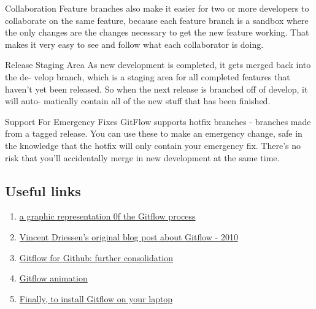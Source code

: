 \documentclass{tufte-handout}
\begin{document}
		\alphaparagraph Collaboration Feature branches also make it easier for two or more
		developers to collaborate on the same feature, because each feature
		branch is a sandbox where the only changes are the changes necessary to get the new
		feature working. That makes it very easy to see and follow what each
		collaborator is doing.
		\medskip
		
		\alphaparagraph Release Staging Area As new development is completed, it gets merged
		back into the de- velop branch, which is a staging area for all
		completed features that haven't yet been released. So when the next
		release is branched off of develop, it will auto- matically contain all
		of the new stuff that has been finished.
		\medskip
		
		\alphaparagraph Support For Emergency Fixes GitFlow supports hotfix branches -
		branches made from a tagged release. You can use these to make an
		emergency change, safe in the knowledge that the hotfix will only
		contain your emergency fix. There's no risk that you'll accidentally
		merge in new development at the same time.
		
		\clearpage
		
		\subsection{Useful links}
		
		\begin{enumerate}
			\def\labelenumi{\arabic{enumi}.}
			\item
			\href{https://danielkummer.github.io/git-flow-cheatsheet/#features}{a graphic representation 0f the Gitflow process}
			\item
			\href{https://nvie.com/posts/a-successful-git-branching-model/}{Vincent Driessen's original blog post about Gitflow - 2010}
			\item
			\href{https://datasift.github.io/gitflow/GitFlowForGitHub.html}{Gitflow for Github: further consolidation}
			\item
			\href{https://veerasundar.com/blog/2018/03/gitflow-animated/}{Gitflow animation}
			\item
			\href{https://github.com/nvie/gitflow/}{Finally, to install Gitflow on your laptop}
		\end{enumerate}
	
\end{document}
